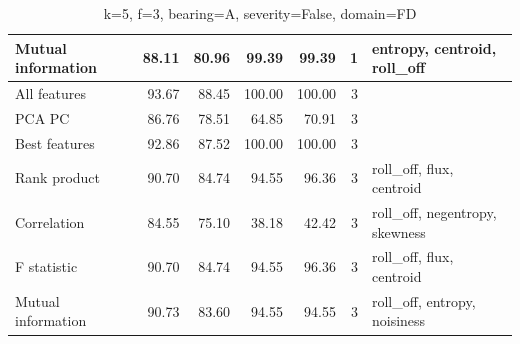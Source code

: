 \begin{table}[h]
\begin{adjustbox}{width=\textwidth}
\begin{tabular}{|l|rr|rr|r|l|}
Mutual information                    & \multicolumn{1}{r|}{88.11}          & 80.96                              & \multicolumn{1}{r|}{99.39}          & 99.39                              & 1                                                   & entropy, centroid, roll\_off            \\ \hline
All features                          & \multicolumn{1}{r|}{93.67}          & 88.45                              & \multicolumn{1}{r|}{100.00}         & 100.00                             & 3                                                   &                                         \\ \hline
PCA PC                                & \multicolumn{1}{r|}{86.76}          & 78.51                              & \multicolumn{1}{r|}{64.85}          & 70.91                              & 3                                                   &                                         \\ \hline
Best features                         & \multicolumn{1}{r|}{92.86}          & 87.52                              & \multicolumn{1}{r|}{100.00}         & 100.00                             & 3                                                   &                                         \\ \hline
Rank product                          & \multicolumn{1}{r|}{90.70}          & 84.74                              & \multicolumn{1}{r|}{94.55}          & 96.36                              & 3                                                   & roll\_off, flux, centroid               \\ \hline
Correlation                           & \multicolumn{1}{r|}{84.55}          & 75.10                              & \multicolumn{1}{r|}{38.18}          & 42.42                              & 3                                                   & roll\_off, negentropy, skewness         \\ \hline
F statistic                           & \multicolumn{1}{r|}{90.70}          & 84.74                              & \multicolumn{1}{r|}{94.55}          & 96.36                              & 3                                                   & roll\_off, flux, centroid               \\ \hline
Mutual information                    & \multicolumn{1}{r|}{90.73}          & 83.60                              & \multicolumn{1}{r|}{94.55}          & 94.55                              & 3                                                   & roll\_off, entropy, noisiness           \\ \hline
\end{tabular}
\end{adjustbox}
\caption{k=5, f=3, bearing=A, severity=False, domain=FD}
\end{table}


